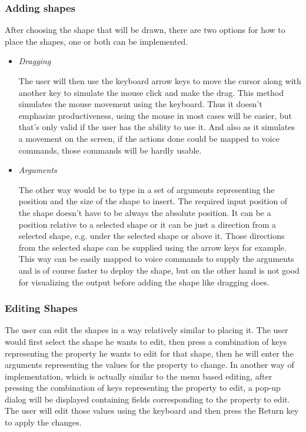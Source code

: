 \subsubsection {Adding shapes}
After choosing the shape that will be drawn, there are two options for how to place the shapes, one or both can be implemented.
\begin{itemize}
\item {\it Dragging}
\par \noindent
The user will then use the keyboard arrow keys to move the cursor along with another key to simulate the mouse click and make the drag. This method simulates the mouse movement using the keyboard. Thus it doesn't emphasize productiveness, using the mouse in most cases will be easier, but that's only valid if the user has the ability to use it. And also as it simulates a movement on the screen, if the actions done could be mapped to voice commands, those commands will be hardly usable.

\item {\it Arguments}
\par \noindent
The other way would be to type in a set of arguments representing the position and the size of the shape to insert. The required input position of the shape doesn't have to be always the absolute position. It can be a position relative to a selected shape or it can be just a direction from a selected shape, e.g. under the selected shape or above it. Those directions from the selected shape can be supplied using the arrow keys for example. This way can be easily mapped to voice commands to supply the arguments and is of course faster to deploy the shape, but on the other hand is not good for visualizing the output before adding the shape like dragging does.
\end{itemize}

\subsubsection  {Editing Shapes}
The user can edit the shapes in a way relatively similar to placing it. The user would first select the shape he wants to edit, then press a combination of keys representing the property he wants to edit for that shape, then he will enter the arguments representing the values for the property to change. In another way of implementation, which is actually similar to the menu based editing, after pressing the combination of keys representing the property to edit, a pop-up dialog will be displayed containing fields corresponding to the property to edit. The user will edit those values using the keyboard and then press the Return key to apply the changes.

